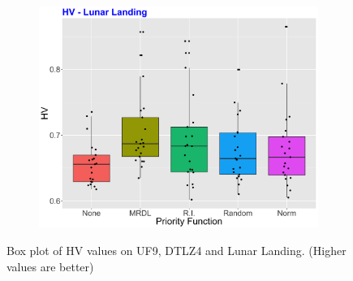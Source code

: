 \begin{figure}[!t]
\begin{subfigure}[b]{0.33\textwidth}
	\end{subfigure}
\begin{subfigure}[b]{0.33\textwidth}
	\centering
	\includegraphics[width=1\textwidth, height=1\textwidth]{images/moon_HV.png}
\end{subfigure}
	\caption{Box plot of HV values on UF9, DTLZ4 and Lunar Landing. (Higher values are better)}
		\label{HVS}
\end{figure}


